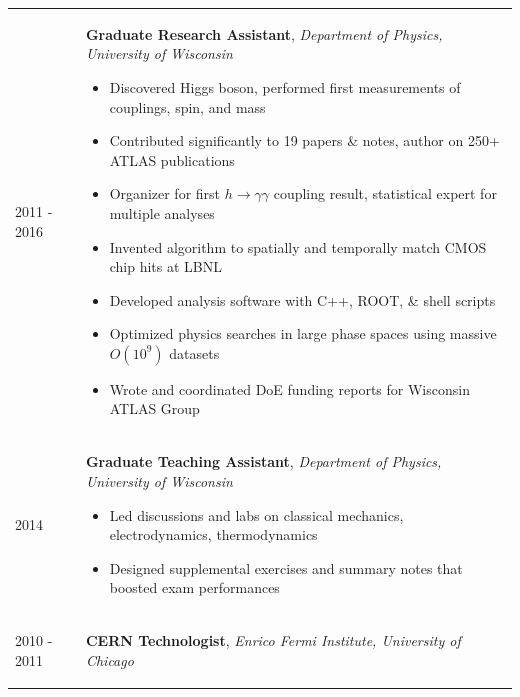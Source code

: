 \documentclass{letter}
\begin{document}
\begin{tabular}{p{}p{}}
	2011 - 2016
	&
	\textbf{Graduate Research Assistant}, \textit{Department of Physics, University of Wisconsin} \newline
	\vspace{-15pt}      %
	\begin{itemize}
		\itemsep0em
		\renewcommand{\labelitemi}{\tiny$\blacksquare$}
    		\item Discovered Higgs boson, performed first measurements of couplings, spin, and mass 
		\item Contributed significantly to 19 papers \& notes, author on 250+ ATLAS publications
    		\item Organizer for first $h\rightarrow\gamma\gamma$ coupling result, statistical expert for multiple analyses
		\item Invented algorithm to spatially and temporally match CMOS chip hits at LBNL 
    		\item Developed analysis software with C++, ROOT, \& shell scripts
		\item Optimized physics searches in large phase spaces using massive $O(10^{9})$ datasets 
		\item Wrote and coordinated DoE funding reports for Wisconsin ATLAS Group
	\end{itemize}
\\
	2014 
	& 
	\textbf{Graduate Teaching Assistant}, \textit{Department of Physics, University of Wisconsin} \newline
	\vspace{-15pt}      %
	\begin{itemize}
		\itemsep0em
		\renewcommand{\labelitemi}{\tiny$\blacksquare$} 
		\item Led discussions and labs on classical mechanics, electrodynamics, thermodynamics
    		\item Designed supplemental exercises and summary notes that boosted exam performances
	\end{itemize}
\\
	2010 - 2011
	&
	\textbf{CERN Technologist}, \textit{Enrico Fermi Institute, University of Chicago} \newline
	\vspace{-15pt}      %
	\begin{itemize}

\end{itemize}
\end{tabular}
\end{document}
